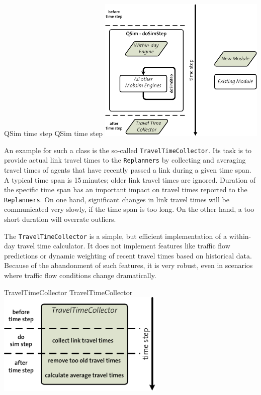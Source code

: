 \createfigure%
{QSim time step}%
{QSim time step}%
{\label{fig:labelQSimTimeStep}}%
{\includegraphics[width=8.0cm, angle=0]{extending/figures/WithinDayReplanning/QSimTimeStep}}%
{}


An example for such a class is the so-called \lstinline{TravelTimeCollector}. Its task is to provide actual link travel times to the \lstinline{Replanners} by collecting and averaging travel times of agents that have recently passed a link during a given time span. A typical time span is 15\,minutes; older link travel times are ignored. Duration of the specific time span has an important impact on travel times reported to the \lstinline{Replanners}. On one hand, significant changes in link travel times will be communicated very slowly, if the time span is too long. On the other hand, a too short duration will overrate outliers.

The \lstinline{TravelTimeCollector} is a simple, but efficient implementation of a within-day travel time calculator. It does not implement features like traffic flow predictions or dynamic weighting of recent travel times based on historical data. 
Because of the abandonment of such features, it is very robust, even in scenarios where traffic flow conditions change dramatically.

\createfigure%
{TravelTimeCollector}%
{TravelTimeCollector}%
{\label{fig:labelTravelTimeCollector}}%
{\includegraphics[width=8.0cm, angle=0]{extending/figures/WithinDayReplanning/TravelTimeCollector}}%
{}

